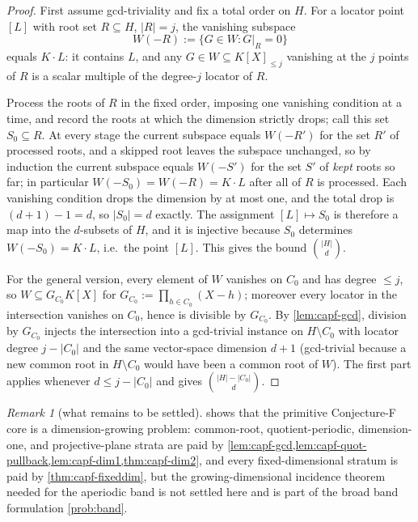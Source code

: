 \documentclass[11pt]{article}
\theoremstyle{definition}
\theoremstyle{remark}
\newtheorem{remark}[remark]{Remark}
\begin{document}
\begin{proof}
First assume gcd-triviality and fix a total order on $H$.  For a locator point $[L]$ with root set $R\subseteq H$, $|R|=j$, the vanishing subspace
\[
        W(-R):=\{G\in W:G|_R=0\}
\]
equals $K\cdot L$: it contains $L$, and any $G\in W\subseteq K[X]_{\le j}$ vanishing at the $j$ points of $R$ is a scalar multiple of the degree-$j$ locator of $R$.

Process the roots of $R$ in the fixed order, imposing one vanishing condition at a time, and record the roots at which the dimension strictly drops; call this set $S_0\subseteq R$.  At every stage the current subspace equals $W(-R')$ for the set $R'$ of processed roots, and a skipped root leaves the subspace unchanged, so by induction the current subspace equals $W(-S')$ for the set $S'$ of \emph{kept} roots so far; in particular $W(-S_0)=W(-R)=K\cdot L$ after all of $R$ is processed.  Each vanishing condition drops the dimension by at most one, and the total drop is $(d+1)-1=d$, so $|S_0|=d$ exactly.  The assignment $[L]\mapsto S_0$ is therefore a map into the $d$-subsets of $H$, and it is injective because $S_0$ determines $W(-S_0)=K\cdot L$, i.e.\ the point $[L]$.  This gives the bound $\binom{|H|}d$.

For the general version, every element of $W$ vanishes on $C_0$ and has degree $\le j$, so $W\subseteq G_{C_0}K[X]$ for $G_{C_0}:=\prod_{h\in C_0}(X-h)$; moreover every locator in the intersection vanishes on $C_0$, hence is divisible by $G_{C_0}$.  By \cref{lem:capf-gcd}, division by $G_{C_0}$ injects the intersection into a gcd-trivial instance on $H\setminus C_0$ with locator degree $j-|C_0|$ and the same vector-space dimension $d+1$ \textup{(gcd-trivial because a new common root in $H\setminus C_0$ would have been a common root of $W$)}.  The first part applies whenever $d\le j-|C_0|$ and gives $\binom{|H|-|C_0|}d$.
\end{proof}

\begin{remark}[what remains to be settled]\label{rem:capf-conjf-open}
 shows that the primitive Conjecture-F core is a dimension-growing problem: common-root, quotient-periodic, dimension-one, and projective-plane strata are paid by \cref{lem:capf-gcd,lem:capf-quot-pullback,lem:capf-dim1,thm:capf-dim2}, and every fixed-dimensional stratum is paid by \cref{thm:capf-fixeddim}, but the growing-dimensional incidence theorem needed for the aperiodic band is not settled here and is part of the broad band formulation \cref{prob:band}.
\end{remark}
\end{document}
